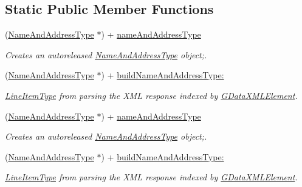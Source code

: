 \subsection*{Static Public Member Functions}
\begin{DoxyCompactItemize}
\item 
(\hyperlink{interface_name_and_address_type}{NameAndAddressType} $\ast$) + \hyperlink{interface_name_and_address_type_a5bde884f28077c4b2228f044e2347634}{nameAndAddressType}
\begin{DoxyCompactList}\small\item\em Creates an autoreleased \hyperlink{interface_name_and_address_type}{NameAndAddressType} object;. \item\end{DoxyCompactList}\item 
(\hyperlink{interface_name_and_address_type}{NameAndAddressType} $\ast$) + \hyperlink{interface_name_and_address_type_aae29be499f2d1a89fbce8e9a0401dfc7}{buildNameAndAddressType:}
\begin{DoxyCompactList}\small\item\em \hyperlink{interface_line_item_type}{LineItemType} from parsing the XML response indexed by \hyperlink{interface_g_data_x_m_l_element}{GDataXMLElement}. \item\end{DoxyCompactList}\item 
(\hyperlink{interface_name_and_address_type}{NameAndAddressType} $\ast$) + \hyperlink{interface_name_and_address_type_a5bde884f28077c4b2228f044e2347634}{nameAndAddressType}
\begin{DoxyCompactList}\small\item\em Creates an autoreleased \hyperlink{interface_name_and_address_type}{NameAndAddressType} object;. \item\end{DoxyCompactList}\item 
(\hyperlink{interface_name_and_address_type}{NameAndAddressType} $\ast$) + \hyperlink{interface_name_and_address_type_aae29be499f2d1a89fbce8e9a0401dfc7}{buildNameAndAddressType:}
\begin{DoxyCompactList}\small\item\em \hyperlink{interface_line_item_type}{LineItemType} from parsing the XML response indexed by \hyperlink{interface_g_data_x_m_l_element}{GDataXMLElement}. \item\end{DoxyCompactList}\item 

\end{DoxyCompactItemize}
